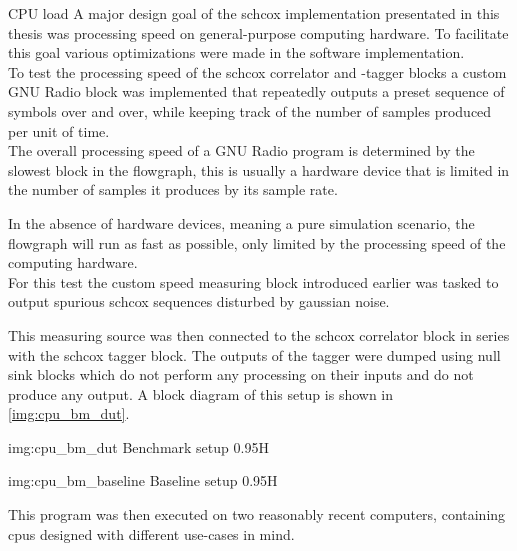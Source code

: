 \begin{subchapter}{CPU load}
  A major design goal of the \gls{schcox} implementation
  presentated in this thesis was processing speed on
  general-purpose computing hardware.
  To facilitate this goal various optimizations were
  made in the software implementation. \\

  To test the processing speed of the
  \gls{schcox} correlator and -tagger blocks
  a custom GNU Radio block was implemented that repeatedly outputs
  a preset sequence of symbols over and over, while keeping
  track of the number of samples produced per unit of time. \\

  The overall processing speed of a GNU Radio program
  is determined by the slowest block in the flowgraph,
  this is usually a hardware device that is limited in
  the number of samples it produces by its sample rate.

  In the absence of hardware devices, meaning a pure
  simulation scenario, the flowgraph will run as fast
  as possible, only limited by the processing speed
  of the computing hardware. \\

  For this test the custom speed measuring block
  introduced earlier was tasked to output spurious
  \gls{schcox} sequences disturbed by gaussian noise.

  This measuring source was then connected to the
  \gls{schcox} correlator block in series with
  the \gls{schcox} tagger block.
  The outputs of the tagger were dumped using
  null sink blocks which do not perform any processing
  on their inputs and do not produce any output.
  A block diagram of this setup is shown in
  \autoref{img:cpu_bm_dut}.


  \vspace{0.5cm}
  \begin{minipage}{.5\textwidth}
                 {img:cpu_bm_dut}
                 {Benchmark setup}
                 {0.95}{H}
  \end{minipage}%
  \begin{minipage}{0.5\textwidth}
                 {img:cpu_bm_baseline}
                 {Baseline setup}
                 {0.95}{H}
  \end{minipage}
  \vspace{0.5cm}


  This program was then executed on two reasonably
  recent computers, containing \glspl{cpu} designed
  with different use-cases in mind.


\end{subchapter}

